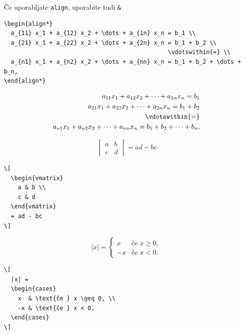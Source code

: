 \documentclass[aspectratio=169]{beamer}
\begin{document}
\begin{frame}[fragile]{Če uporabljate \texttt{align}, uporabite tudi \texttt{\&}}
  \begin{slaboenv}
    \begin{verbatim}
\begin{align*}
  a_{11} x_1 + a_{12} x_2 + \dots + a_{1n} x_n = b_1 \\
  a_{21} x_1 + a_{22} x_2 + \dots + a_{2n} x_n = b_1 + b_2 \\
                                               \vdotswithin{=} \\
  a_{n1} x_1 + a_{n2} x_2 + \dots + a_{nn} x_n = b_1 + b_2 + \dots + b_n,
\end{align*}
    \end{verbatim}
    \small
    \begin{align*}
      a_{11} x_1 + a_{12} x_2 + \dots + a_{1n} x_n = b_1 \\
      a_{21} x_1 + a_{22} x_2 + \dots + a_{2n} x_n = b_1 + b_2 \\
      \vdotswithin{=} \\
      a_{n1} x_1 + a_{n2} x_2 + \dots + a_{nn} x_n = b_1 + b_2 + \dots + b_n,
    \end{align*}
  \end{slaboenv}
\end{frame}

\begin{frame}[fragile]{}
  \[
    \begin{vmatrix}
      a & b \\
      c & d
    \end{vmatrix}
    = ad - bc
  \]

  \begin{verbatim}
\[
  \begin{vmatrix}
    a & b \\
    c & d
  \end{vmatrix}
  = ad - bc
\]
  \end{verbatim}
\end{frame}

\begin{frame}[fragile]{}
  \[
    |x| =
    \begin{cases}
      x  & \text{če } x \geq 0, \\
      -x & \text{če } x < 0.
    \end{cases}
  \]

  \begin{verbatim}
\[
  |x| =
  \begin{cases}
    x  & \text{če } x \geq 0, \\
    -x & \text{če } x < 0.
  \end{cases}
\]
  \end{verbatim}
\end{frame}
\end{document}
